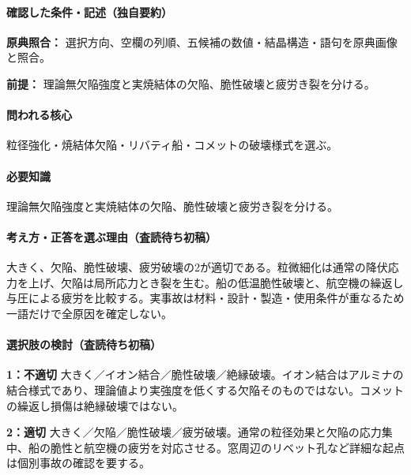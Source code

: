 \paragraph{確認した条件・記述（独自要約）}\mbox{}\par

\noindent\textbf{原典照合：} 選択方向、空欄の列順、五候補の数値・結晶構造・語句を原典画像と照合。\par

\noindent\textbf{前提：} 理論無欠陥強度と実焼結体の欠陥、脆性破壊と疲労き裂を分ける。\par

\paragraph{問われる核心} 粒径強化・焼結体欠陥・リバティ船・コメットの破壊様式を選ぶ。

\paragraph{必要知識} 理論無欠陥強度と実焼結体の欠陥、脆性破壊と疲労き裂を分ける。

\paragraph{考え方・正答を選ぶ理由（査読待ち初稿）} 大きく、欠陥、脆性破壊、疲労破壊の2が適切である。粒微細化は通常の降伏応力を上げ、欠陥は局所応力とき裂を生む。船の低温脆性破壊と、航空機の繰返し与圧による疲労を比較する。実事故は材料・設計・製造・使用条件が重なるため一語だけで全原因を確定しない。

\paragraph{選択肢の検討（査読待ち初稿）}\mbox{}\par

\noindent\textbf{1：不適切} 大きく／イオン結合／脆性破壊／絶縁破壊。イオン結合はアルミナの結合様式であり、理論値より実強度を低くする欠陥そのものではない。コメットの繰返し損傷は絶縁破壊ではない。\par

\noindent\textbf{2：適切} 大きく／欠陥／脆性破壊／疲労破壊。通常の粒径効果と欠陥の応力集中、船の脆性と航空機の疲労を対応させる。窓周辺のリベット孔など詳細な起点は個別事故の確認を要する。\par

